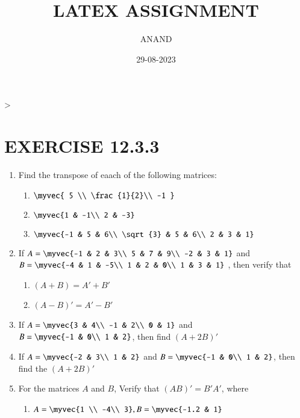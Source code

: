 \documentclass{article}
\theoremstyle{remark}
\begin{document}
\title{LATEX ASSIGNMENT}
\author{ANAND}
\date{29-08-2023}
\maketitle                                                                       >
\section*{EXERCISE 12.3.3}
\begin{enumerate}
\item Find the transpose of eaach of the following matrices:
\begin{enumerate}[label=(\roman*)]
\item $\myvec{ 5 \\ \frac{1}{2}\\ -1 }$
\item $\myvec {1 & -1\\ 2 & -3}$
\item $\myvec{-1 & 5 & 6\\ \sqrt{3} & 5 & 6\\ 2 & 3 & 1}$
\end{enumerate}
\item If $A=\myvec {-1 & 2 & 3\\ 5 & 7 & 9\\ -2 & 3 & 1}$ and $B= \myvec{-4 & 1 & -5\\ 1 & 2 & 0\\ 1 & 3 & 1}$
, then verify that
\begin{enumerate}
\item $(A+B)=A'+B'$
\item $(A-B)'=A'-B'$
\end{enumerate}
\item If $A=\myvec{3 & 4\\ -1 & 2\\ 0 & 1}$ and $B=\myvec{-1 & 0\\ 1 & 2}$, then find $(A+2B)'$
\item If $A=\myvec{-2 & 3\\ 1 & 2}$ and $B=\myvec{-1 & 0\\ 1 & 2} $, then find the $(A+2B)'$
\item For the matrices $A$ and $B$, Verify that $(AB)'= B'A'$, where 
\begin{enumerate}[label=(\roman*)]
\item $A=\myvec {1 \\ -4\\  3} , B=\myvec {-1.2 & 1}$

\end{enumerate}
\end{enumerate}
\end{document}
